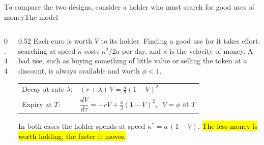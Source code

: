 \documentclass[aspectratio=169,9pt]{beamer}
\begin{document}
\begin{frame}{To compare the two designs, consider a holder who must search for good uses of money}{The model}
  \begin{columns}[c]
    \begin{column}{0.44\textwidth}
    \end{column}
    \begin{column}{0.52\textwidth}
      \small
      Each euro is worth $V$ to its holder. Finding a good use for it takes effort: searching at speed $\kappa$ costs $\kappa^2/2a$ per day, and $\kappa$ is the velocity of money. A bad use, such as buying something of little value or selling the token at a discount, is always available and worth $\phi<1$.

      \vspace{0.5em}
      \begin{tabular}{@{}ll@{}}
        \textcolor{accent}{Decay at rate $\lambda$:} & $(r+\lambda)\,V = \tfrac a2(1-V)^2$ \\[0.3em]
        \textcolor{warm}{Expiry at $T$:} & $\dfrac{dV}{d\tau} = -rV + \tfrac a2(1-V)^2,\;\; V=\phi$ at $T$
      \end{tabular}

      \vspace{0.5em}
      In both cases the holder spends at speed $\kappa^* = a\,(1-V)$.
      \hl{The less money is worth holding, the faster it moves.}
    \end{column}
  \end{columns}
\end{frame}
\end{document}
